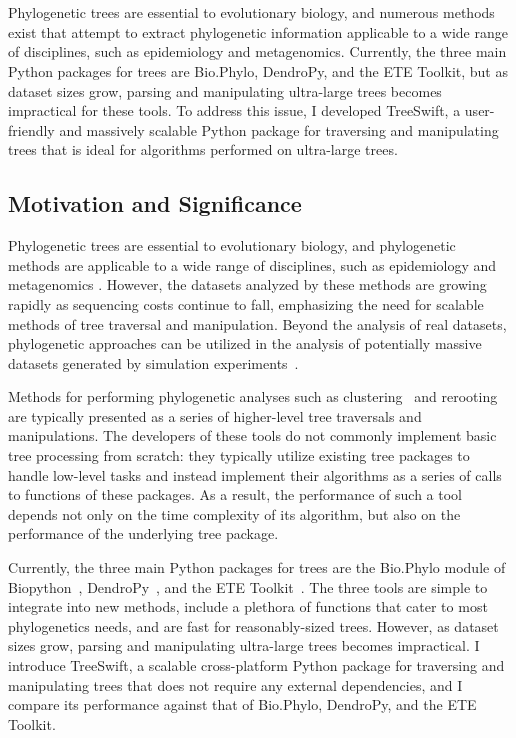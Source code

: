 \chapter{\treeswifttitle}
\label{chap:treeswift}
\clearpage

Phylogenetic trees are essential to evolutionary biology, and numerous methods exist that attempt to extract phylogenetic information applicable to a wide range of disciplines, such as epidemiology and metagenomics. Currently, the three main Python packages for trees are Bio.Phylo, DendroPy, and the ETE Toolkit, but as dataset sizes grow, parsing and manipulating ultra-large trees becomes impractical for these tools. To address this issue, I developed TreeSwift, a user-friendly and massively scalable Python package for traversing and manipulating trees that is ideal for algorithms performed on ultra-large trees.

\section{Motivation and Significance}\label{sec:treeswift-background}
Phylogenetic trees are essential to evolutionary biology, and phylogenetic methods are applicable to a wide range of disciplines, such as epidemiology \cite{Ragonnet-Cronin2013,Rose2017} and metagenomics \cite{Kembel2011,Darling2014,Filipski2015}. However, the datasets analyzed by these methods are growing rapidly as sequencing costs continue to fall, emphasizing the need for scalable methods of tree traversal and manipulation. Beyond the analysis of real datasets, phylogenetic approaches can be utilized in the analysis of potentially massive datasets generated by simulation experiments~\cite{Moshiri2018}.

Methods for performing phylogenetic analyses such as clustering~\cite{Balaban2019} and rerooting~\cite{Mai2017} are typically presented as a series of higher-level tree traversals and manipulations. The developers of these tools do not commonly implement basic tree processing from scratch: they typically utilize existing tree packages to handle low-level tasks and instead implement their algorithms as a series of calls to functions of these packages. As a result, the performance of such a tool depends not only on the time complexity of its algorithm, but also on the performance of the underlying tree package.

Currently, the three main Python packages for trees are the Bio.Phylo module of Biopython~\cite{Cock2009}, DendroPy~\cite{Sukumaran2010}, and the ETE Toolkit~\cite{Huerta-Cepas2016}. The three tools are simple to integrate into new methods, include a plethora of functions that cater to most phylogenetics needs, and are fast for reasonably-sized trees. However, as dataset sizes grow, parsing and manipulating ultra-large trees becomes impractical. I introduce TreeSwift, a scalable cross-platform Python package for traversing and manipulating trees that does not require any external dependencies, and I compare its performance against that of Bio.Phylo, DendroPy, and the ETE Toolkit.

